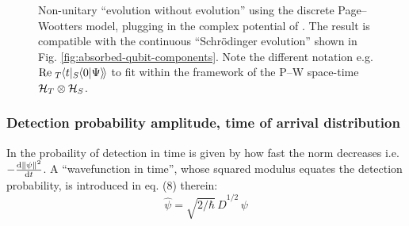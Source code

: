 \begin{figure}
\begin{subfigure}[b]{0.49\textwidth}
    \subcaption{}\label{fig:absorbed-qubit-components_pwlattice:im1}
  \end{subfigure}
  \caption{
    Non-unitary ``evolution without evolution''
    using the discrete Page--Wootters model,
    plugging in
    the complex potential of \cite{RuschhauptAbsorption}.
    The result is compatible with the continuous
    ``Schr\"odinger evolution''
    shown in Fig. \ref{fig:absorbed-qubit-components}.
    Note the different notation e.g.
    $\mathrm{Re}{\;}_{T}\hspace{-.2em}\left\langle t | {}_{S}\hspace{-.2em}\left\langle 0 | \Psi \right\rangle\hspace{-.17em}\right\rangle$
    to fit within the framework of the P--W space-time $\mathcal{H}_T \otimes \mathcal{H}_S$.
  }
  \label{fig:absorbed-qubit-components_pwlattice}
\end{figure}

\subsubsection{Detection probability amplitude, time of arrival distribution}

In \cite{RuschhauptAbsorption} the probaility of detection in time is given
by how fast the norm decreases i.e. $-\dv{\norm{\psi}^2}{t}$.
A ``wavefunction in time'', whose squared modulus equates the detection probability,
is introduced in eq. (8) therein:
\begin{equation}
  \hat{\psi} = \sqrt{2/\hbar}\,\hat{D}^{1/2}\,\psi
\end{equation}